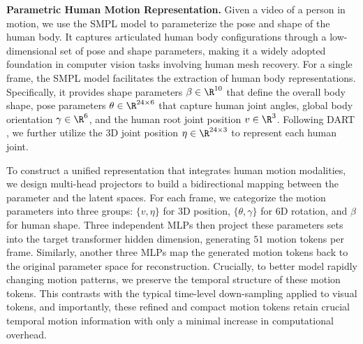 \textbf{Parametric Human Motion Representation.} Given a video of a person in motion, we use the SMPL \citep{loper2023smpl} model to parameterize the pose and shape of the human body. It captures articulated human body configurations through a low-dimensional set of pose and shape parameters, making it a widely adopted foundation in computer vision tasks involving human mesh recovery. For a single frame, the SMPL model facilitates the extraction of human body representations. Specifically, it provides shape parameters $\beta \in \R^{10}$ that define the overall body shape, pose parameters  $\theta \in \R^{24 \times 6}$ that capture human joint angles, global body orientation $\gamma \in \R^{6}$, and the human root joint position $v \in \R^{3}$. Following DART \citep{zhao2024dartcontrol}, we further utilize the 3D joint position $\eta \in \R^{24 \times 3}$ to represent each human joint.


To construct a unified representation that integrates human motion modalities, we design multi-head projectors to build a bidirectional mapping between the parameter and the latent spaces. For each frame, we categorize the motion parameters into three groups: $\{v, \eta\}$ for 3D position, $\{\theta,\gamma\}$ for 6D rotation, and $\beta$ for human shape. Three independent MLPs then project these 
parameters sets into the target transformer hidden dimension, generating $51$ motion tokens per frame. Similarly, another three MLPs map the generated motion tokens back to the original parameter space for reconstruction. Crucially, to better model rapidly changing motion patterns, we preserve the temporal structure of these motion tokens. This contrasts with the typical time-level down-sampling applied to visual tokens, and importantly, these refined and compact motion tokens retain crucial temporal motion information with only a minimal increase in computational overhead.


